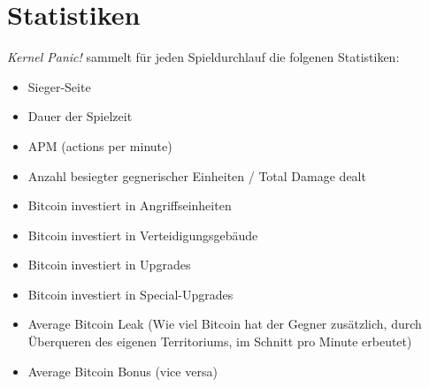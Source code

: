 \section{Statistiken}

%
%

\emph{Kernel Panic!} sammelt für jeden Spieldurchlauf die folgenen Statistiken:

\begin{itemize}[noitemsep, leftmargin=*]
	\item Sieger-Seite
	\item Dauer der Spielzeit
	\item APM (actions per minute)
	\item Anzahl besiegter gegnerischer Einheiten / Total Damage dealt
	\item Bitcoin investiert in Angriffseinheiten
	\item Bitcoin investiert in Verteidigungsgebäude
	\item Bitcoin investiert in Upgrades
	\item Bitcoin investiert in Special-Upgrades
	\item Average Bitcoin Leak (Wie viel Bitcoin hat der Gegner zusätzlich, durch Überqueren des eigenen Territoriums, im Schnitt pro Minute erbeutet)
	\item Average Bitcoin Bonus (vice versa)
\end{itemize}

